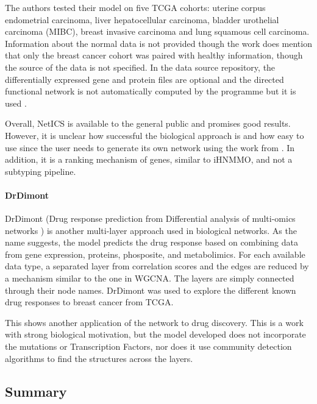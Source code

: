 The authors tested their model on five TCGA cohorts: uterine corpus endometrial carcinoma, liver hepatocellular carcinoma, bladder urothelial carcinoma (MIBC), breast invasive carcinoma and lung squamous cell carcinoma. Information about the normal data is not provided though the work does mention that only the breast cancer cohort was paired with healthy information, though the source of the data is not specified. In the data source repository, the differentially expressed gene and protein files are optional and the directed functional network is not automatically computed by the programme but it is used \citet{Wu2010-ap}.

Overall, NetICS is available to the general public and promises good results. However, it is unclear how successful the biological approach is and how easy to use since the user needs to generate its own network using the work from \citet{Wu2010-ap}. In addition, it is a ranking mechanism of genes, similar to iHNMMO, and not a subtyping pipeline.



\paragraph*{DrDimont} \label{s:lit:drDimont}

DrDimont (Drug response prediction from Differential analysis of multi-omics networks \citet{Hiort2022-lk}) is another multi-layer approach used in biological networks. As the name suggests, the model predicts the drug response based on combining data from gene expression, proteins, phosposite, and metabolimics. For each available data type, a separated layer from correlation scores and the edges are reduced by a mechanism similar to the one in WGCNA. The layers are simply connected through their node names. DrDimont was used to explore the different known drug responses to breast cancer from TCGA.

This shows another application of the network to drug discovery. This is a work with strong biological motivation, but the model developed does not incorporate the mutations or Transcription Factors, nor does it use community detection algorithms to find the structures across the layers.

\subsection{Summary}


